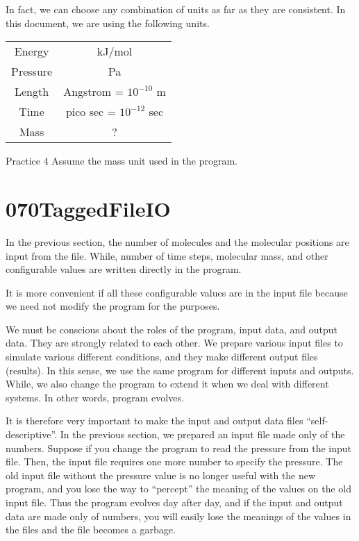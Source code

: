 \documentclass[a4,10pt]{article}
\begin{document}
In fact, we can choose any combination of units as far as they are consistent.  In this document, we are using the following units.
\begin{center}
\begin{tabular}{cc}
\hline
Energy&kJ/mol\\
Pressure&Pa\\
Length&Angstrom = $10^{-10}$ m\\
Time&pico sec = $10^{-12}$ sec\\
Mass&?\\
 \hline
 \end{tabular}
\end{center}
\begin{itembox}[l]{Practice 4}
Assume the mass unit used in the program.
\end{itembox}
\section{070TaggedFileIO}
In the previous section, the number of molecules and the molecular positions are input from the file.  While, number of time steps, molecular mass, and other configurable values are written directly in the program.

It is more convenient if all these configurable values are in the input file because we need not modify the program for the purposes.

We must be conscious about the roles of the program, input data, and output data.  They are strongly related to each other.  We prepare various input files to simulate various different conditions, and they make different output files (results).  In this sense, we use the same program for different inputs and outputs.  While, we also change the program to extend it when we deal with different systems.  In other words, program evolves.

It is therefore very important to make the input and output data files ``self-descriptive''.  In the previous section, we prepared an input file made only of the numbers.  Suppose if you change the program to read the pressure from the input file.  Then, the input file requires one more number to specify the pressure.  The old input file without the pressure value is no longer useful with the new program, and you lose the way to ``percept'' the meaning of the values on the old input file.  Thus the program evolves day after day, and if the input and output data are made only of numbers, you will easily lose the meanings of the values in the files and the file becomes a garbage.
\end{document}
